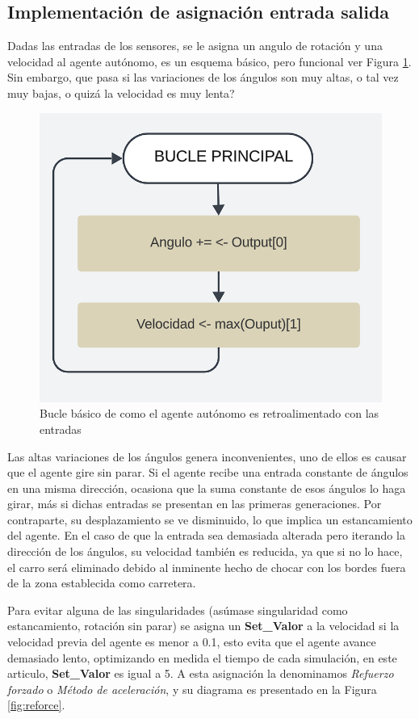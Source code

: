 \documentclass[lettersize, journal]{IEEEtran}
\begin{document}
\subsection{Implementación de asignación entrada  salida}
Dadas las entradas de los sensores, se le asigna un angulo de rotación y una velocidad al agente autónomo, es un esquema básico, pero funcional ver Figura \ref{fig:Bucle_basico}. Sin embargo, que pasa si las variaciones de los ángulos son muy altas, o tal vez muy bajas, o quizá la velocidad es muy lenta?
\begin{figure}
    \centering
    \includegraphics[scale=0.25]{images/bucle_inicial.png}
    \caption{Bucle básico de como el agente autónomo es retroalimentado con las entradas}
    \label{fig:Bucle_basico}
\end{figure} 
Las altas variaciones de los ángulos genera inconvenientes, uno de ellos es causar que el agente gire sin parar. Si el agente recibe una entrada constante de ángulos en una misma dirección, ocasiona que la suma constante de esos ángulos lo haga girar, más si dichas entradas se presentan en las primeras generaciones. Por contraparte, su desplazamiento se ve disminuido, lo que implica un estancamiento del agente. En el caso de que la entrada sea demasiada alterada pero iterando la dirección de los ángulos, su velocidad también es reducida, ya que si no lo hace, el carro será eliminado debido al inminente hecho de chocar con los bordes fuera de la zona establecida como carretera.

Para evitar alguna de las singularidades (asúmase singularidad como estancamiento, rotación sin parar) se asigna un \textbf{Set\_Valor} a la velocidad si la velocidad previa del agente es menor a 0.1, esto evita que el agente avance demasiado lento, optimizando en medida el tiempo de cada simulación, en este articulo, \textbf{Set\_Valor} es igual a 5. A esta asignación la denominamos \textit{Refuerzo forzado} o \textit{Método de aceleración}, y su diagrama es presentado en la Figura \ref{fig:reforce}.
\end{document}
